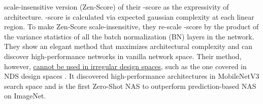 \documentclass[lettersize,journal]{IEEEtran}
\begin{document}
scale-insensitive version (Zen-Score) of their -score as the expressivity of architecture. -score is calculated via expected gaussian complexity at each linear region. To make Zen-Score scale-insensitive, they re-scale -score by the product of the variance statistics of all the batch normalization (BN) layers in the network. They show an elegant method that maximizes architectural complexity and can discover high-performance networks in vanilla network space. Their method, however, \underline{cannot be used in irregular design spaces}, such as the one covered in NDS design spaces \cite{nds}. It discovered high-performance architectures in MobileNetV3 \cite{Mobilenetv3} search space and is the first Zero-Shot NAS to outperform prediction-based NAS on ImageNet.
\end{document}
